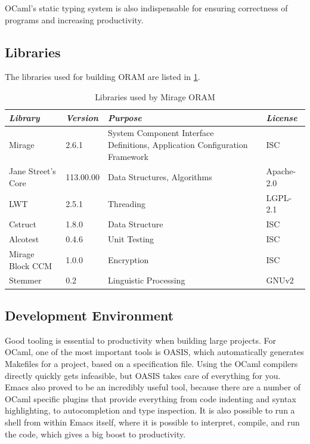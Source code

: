 \documentclass[12pt,a4paper,twoside,openright]{report}
\begin{document}
OCaml's static typing system is also indispensable for ensuring correctness of programs and increasing productivity.

\subsection{Libraries}
\label{subsec:libraries}

The libraries used for building ORAM are listed in \cref{tab:libraries}.

\begin{table}[h]
\centering
\begin{tabularx}{\textwidth}{|l|l|X|l|}
\hline
\textit{Library} & \textit{Version} & \textit{Purpose} & \textit{License} \\
\hline \hline
Mirage & 2.6.1 & System Component Interface Definitions, Application Configuration Framework & ISC \\
\hline
Jane Street's Core & 113.00.00 & Data Structures, Algorithms & Apache-2.0 \\
\hline
LWT & 2.5.1 & Threading & LGPL-2.1 \\
\hline
Cstruct & 1.8.0 & Data Structure & ISC \\
\hline
Alcotest & 0.4.6 & Unit Testing & ISC \\
\hline
Mirage Block CCM & 1.0.0 & Encryption & ISC \\
\hline
Stemmer & 0.2 & Linguistic Processing & GNUv2 \\
\hline
\end{tabularx}
\caption{Libraries used by Mirage ORAM}
\label{tab:libraries}
\end{table}

\subsection{Development Environment}

Good tooling is essential to productivity when building large projects. For OCaml, one of the most important tools is OASIS, which automatically generates Makefiles for a project, based on a specification file. Using the OCaml compilers directly quickly gets infeasible, but OASIS takes care of everything for you. Emacs also proved to be an incredibly useful tool, because there are a number of OCaml specific plugins that provide everything from code indenting and syntax highlighting, to autocompletion and type inspection. It is also possible to run a shell from within Emacs itself, where it is possible to interpret, compile, and run the code, which gives a big boost to productivity.
\end{document}
